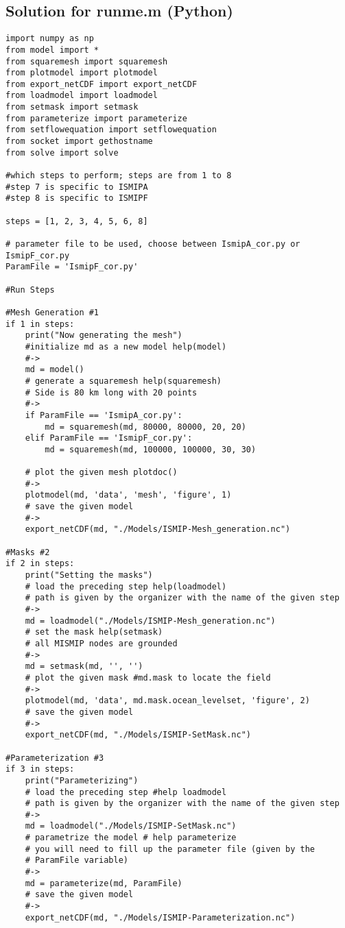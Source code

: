 \subsection{Solution for runme.m (Python)}%
\begin{verbatim}import numpy as np
from model import *
from squaremesh import squaremesh
from plotmodel import plotmodel
from export_netCDF import export_netCDF
from loadmodel import loadmodel
from setmask import setmask
from parameterize import parameterize
from setflowequation import setflowequation
from socket import gethostname
from solve import solve

#which steps to perform; steps are from 1 to 8
#step 7 is specific to ISMIPA
#step 8 is specific to ISMIPF

steps = [1, 2, 3, 4, 5, 6, 8]

# parameter file to be used, choose between IsmipA_cor.py or IsmipF_cor.py
ParamFile = 'IsmipF_cor.py'

#Run Steps

#Mesh Generation #1
if 1 in steps:
    print("Now generating the mesh")
    #initialize md as a new model help(model)
    #->
    md = model()
    # generate a squaremesh help(squaremesh)
    # Side is 80 km long with 20 points
    #->
    if ParamFile == 'IsmipA_cor.py':
        md = squaremesh(md, 80000, 80000, 20, 20)
    elif ParamFile == 'IsmipF_cor.py':
        md = squaremesh(md, 100000, 100000, 30, 30)

    # plot the given mesh plotdoc()
    #->
    plotmodel(md, 'data', 'mesh', 'figure', 1)
    # save the given model
    #->
    export_netCDF(md, "./Models/ISMIP-Mesh_generation.nc")

#Masks #2
if 2 in steps:
    print("Setting the masks")
    # load the preceding step help(loadmodel)
    # path is given by the organizer with the name of the given step
    #->
    md = loadmodel("./Models/ISMIP-Mesh_generation.nc")
    # set the mask help(setmask)
    # all MISMIP nodes are grounded
    #->
    md = setmask(md, '', '')
    # plot the given mask #md.mask to locate the field
    #->
    plotmodel(md, 'data', md.mask.ocean_levelset, 'figure', 2)
    # save the given model
    #->
    export_netCDF(md, "./Models/ISMIP-SetMask.nc")

#Parameterization #3
if 3 in steps:
    print("Parameterizing")
    # load the preceding step #help loadmodel
    # path is given by the organizer with the name of the given step
    #->
    md = loadmodel("./Models/ISMIP-SetMask.nc")
    # parametrize the model # help parameterize
    # you will need to fill up the parameter file (given by the
    # ParamFile variable)
    #->
    md = parameterize(md, ParamFile)
    # save the given model
    #->
    export_netCDF(md, "./Models/ISMIP-Parameterization.nc")


\end{verbatim}
